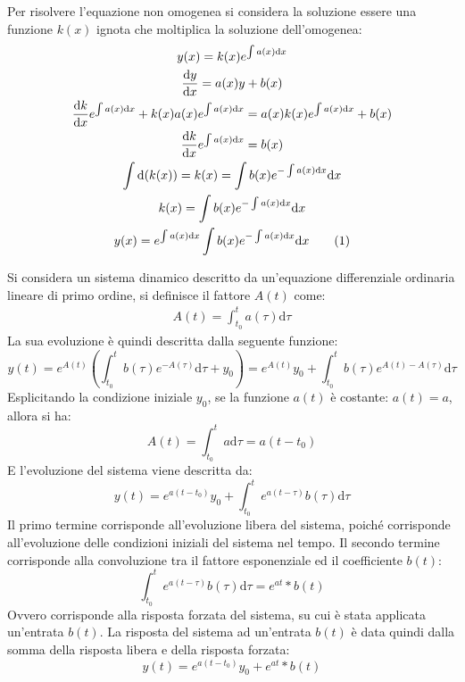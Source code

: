 \documentclass{article}
\numberwithin{equation}{subsection}
\newcommand{\df}{\mathrm{d}}
\newcommand{\tageq}{\tag{\stepcounter{equation}\theequation}}
\begin{document}
Per risolvere l'equazione non omogenea si considera la soluzione essere una funzione $k(x)$ ignota che moltiplica la soluzione dell'omogenea:
\begin{gather*}
    y(x)=k(x)e^{\int a(x)\df x}\\
    \displaystyle\frac{\df y}{\df x}=a(x)y+b(x)\\
    \displaystyle\frac{\df k}{\df x}e^{\int a(x)\df x}+k(x) a(x)e^{\int a(x)\df x}=a(x)k(x)e^{\int a(x)\df x}+b(x)\\
    \displaystyle\frac{\df k}{\df x}e^{\int a(x)\df x}=b(x)\\
    \displaystyle\int \df(k(x))=k(x)=\int b(x)e^{-\int a(x)\df x}\df x\\
    k(x)=\displaystyle\int b(x)e^{-\int a(x)\df x}\df x\\
    y(x)=\displaystyle e^{\int a(x)\df x}\int b(x)e^{-\int a(x)\df x}\df x\tageq
\end{gather*}

Si considera un sistema dinamico descritto da un'equazione differenziale ordinaria lineare di primo ordine, si definisce il fattore $A(t)$ come: 
\begin{gather*}
    A(t)=\displaystyle\int_{t_0}^{t}a(\tau)\df\tau
\end{gather*}
La sua evoluzione è quindi descritta dalla seguente funzione:
\begin{equation*}
    y(t)=e^{A(t)}\left(\int_{t_0}^{t} b(\tau)e^{-A(\tau)}\df\tau+y_0\right)=e^{A(t)}y_0+\int_{t_0}^{t} b(\tau)e^{A(t)-A(\tau)}\df\tau
\end{equation*}
Esplicitando la condizione iniziale $y_0$, se la funzione $a(t)$ è costante: $a(t)=a$, allora si ha: 
\begin{equation*}
    \displaystyle A(t)=\int_{t_0}^{t}a \df\tau=a(t-t_0)
\end{equation*}    
E l'evoluzione del sistema viene descritta da:
\begin{equation*}
    y(t)=e^{a(t-t_0)}y_0+\displaystyle\int_{t_0}^{t} e^{a(t-\tau)}b(\tau)\df\tau
\end{equation*}
Il primo termine corrisponde all'evoluzione libera del sistema, poiché corrisponde all'evoluzione delle condizioni iniziali del sistema nel tempo. Il secondo termine 
corrisponde alla convoluzione tra il fattore esponenziale ed il coefficiente $b(t)$:
\begin{equation*}
    \displaystyle\int_{t_0}^{t} e^{a(t-\tau)}b(\tau)\df\tau=e^{at}*b(t)
\end{equation*}
Ovvero corrisponde alla risposta forzata del sistema, su cui è stata applicata un'entrata $b(t)$. La risposta del sistema ad un'entrata $b(t)$ è data quindi dalla somma 
della risposta libera e della risposta forzata:
\begin{equation}
    y(t)=e^{a(t-t_0)}y_0+e^{at}*b(t)
\end{equation}
\end{document}
